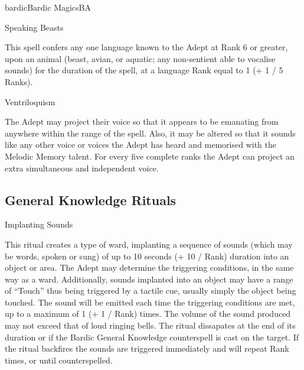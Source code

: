 \begin{college}[2.1]{bardic}{Bardic Magics}{BA}
\begin{spell}[G-10]{Speaking Beasts}

\begin{effects}
This spell confers any one language known to the Adept at Rank 6 or
greater, upon an animal (beast, avian, or aquatic; any non-sentient
able to vocalise sounds) for the duration of the spell, at a language
Rank equal to 1 (+ 1 / 5 Ranks).
\end{effects}
\end{spell}

\begin{spell}[G-11]{Ventriloquism}

\begin{effects}
The Adept may project their voice so that it appears to be emanating
from anywhere within the range of the spell. Also, it may be altered
so that it sounds like any other voice or voices the Adept has heard
and memorised with the Melodic Memory talent. For every five complete
ranks the Adept can project an extra simultaneous and independent
voice.
\end{effects}
\end{spell}

\subsection{General Knowledge Rituals}

\begin{ritual}[Q-1]{Implanting Sounds}

\begin{effects}
This ritual creates a type of ward, implanting a sequence of sounds
(which may be words, spoken or sung) of up to 10 seconds (+ 10 / Rank)
duration into an object or area. The Adept may determine the
triggering conditions, in the same way as a ward.  Additionally,
sounds implanted into an object may have a range of ``Touch'' thus
being triggered by a tactile cue, usually simply the object being
touched. The sound will be emitted each time the triggering conditions
are met, up to a maximum of 1 (+ 1 / Rank) times. The volume of the
sound produced may not exceed that of loud ringing bells. The ritual
dissapates at the end of its duration or if the Bardic General
Knowledge counterspell is cast on the target.  If the ritual backfires
the sounds are triggered immediately and will repeat Rank times, or
until counterspelled.
\end{effects}
\end{ritual}


\end{college}
